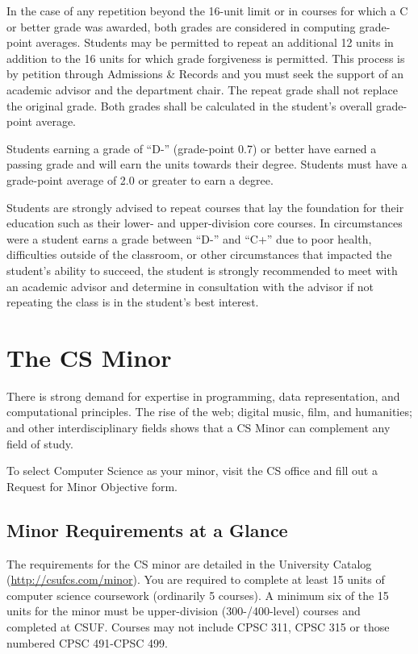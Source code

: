 \documentclass{book}
\newcommand{\shrunkurl}[1]{\url{http://csufcs.com/#1}}
\begin{document}
In the case of any repetition beyond the 16-unit limit or in courses
for which a C or better grade was awarded, both grades are considered
in computing grade-point averages. Students may be permitted to repeat
an additional 12 units in addition to the 16 units for which grade
forgiveness is permitted. This process is by petition through
Admissions \& Records and you must seek the support of an academic
advisor and the department chair. The repeat grade shall not replace
the original grade. Both grades shall be calculated in the student’s
overall grade-point average.

Students earning a grade of ``D-'' (grade-point 0.7) or better have
earned a passing grade and will earn the units towards their
degree. Students must have a grade-point average of 2.0 or greater to
earn a degree.

Students are strongly advised to repeat courses that lay the
foundation for their education such as their lower- and upper-division
core courses. In circumstances were a student earns a grade between
``D-'' and ``C+'' due to poor health, difficulties outside of the
classroom, or other circumstances that impacted the student's ability
to succeed, the student is strongly recommended to meet with an
academic advisor and determine in consultation with the advisor if not
repeating the class is in the student's best interest.


\chapter{The CS Minor}

There is strong demand for expertise in programming, data
representation, and computational principles. The rise of the web;
digital music, film, and humanities; and other interdisciplinary
fields shows that a CS Minor can complement any field of study.

To select Computer Science as your minor, visit the CS office and fill
out a Request for Minor Objective form.

\section{Minor Requirements at a Glance}
The requirements for the CS minor are detailed in the University
Catalog (\shrunkurl{minor}). You are required to complete at least 15
units of computer science coursework (ordinarily 5 courses). A minimum
six of the 15 units for the minor must be upper-division
(300-/400-level) courses and completed at CSUF. Courses may not
include CPSC 311, CPSC 315 or those numbered CPSC 491-CPSC 499.
\end{document}
